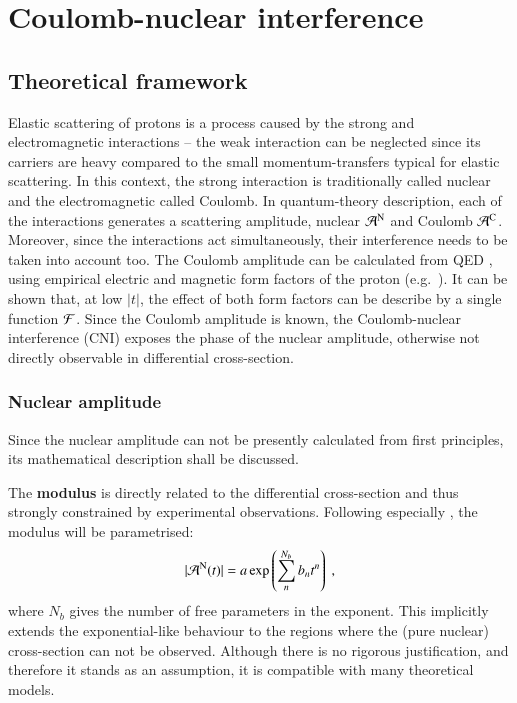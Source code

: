 \section{Coulomb-nuclear interference}


\subsection{Theoretical framework}
\label{sec:cni_framework}

Elastic scattering of protons is a process caused by the strong and electromagnetic interactions -- the weak interaction can be neglected since its carriers are heavy compared to the small momentum-transfers typical for elastic scattering. In this context, the strong interaction is traditionally called nuclear and the electromagnetic called Coulomb. In quantum-theory description, each of the interactions generates a scattering amplitude, nuclear ${\cal A}^{\rm N}$ and Coulomb ${\cal A}^{\rm C}$. Moreover, since the interactions act simultaneously, their interference needs to be taken into account too. The Coulomb amplitude can be calculated from QED \cite{block06}, using empirical electric and magnetic form factors of the proton (e.g.~\cite{puckett10}). It can be shown \cite{jan_thesis} that, at low $|t|$, the effect of both form factors can be describe by a single function ${\cal F}$. Since the Coulomb amplitude is known, the Coulomb-nuclear interference (CNI) exposes the phase of the nuclear amplitude, otherwise not directly observable in differential cross-section. 


\subsubsection{Nuclear amplitude}

Since the nuclear amplitude can not be presently calculated from first principles, its mathematical description shall be discussed.

The {\bf modulus} is directly related to the differential cross-section and thus strongly constrained by experimental observations. Following especially \cite{8tev-90m}, the modulus will be parametrised:
\begin{equation}
\label{eq:nuc mod}
| {\cal A}^{\rm N}(t) | = a \exp\left( \sum\limits_{n}^{N_b} b_n t^n \right)\ ,
\end{equation}
where $N_b$ gives the number of free parameters in the exponent. This implicitly extends the exponential-like behaviour to the regions where the (pure nuclear) cross-section can not be observed. Although there is no rigorous justification, and therefore it stands as an assumption, it is compatible with many theoretical models.

